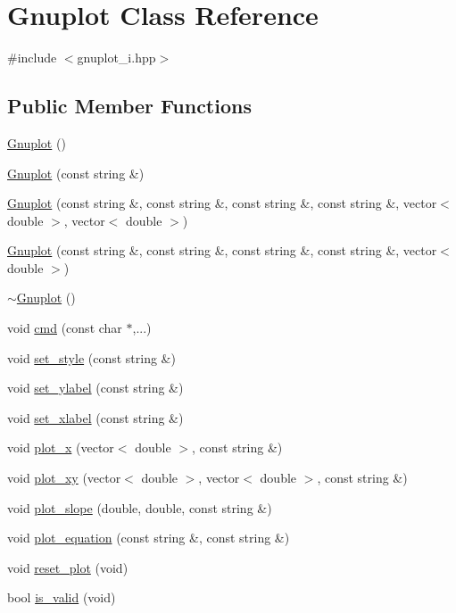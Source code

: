 \hypertarget{class_gnuplot}{}\section{Gnuplot Class Reference}
\label{class_gnuplot}


{\ttfamily \#include $<$gnuplot\+\_\+i.\+hpp$>$}

\subsection*{Public Member Functions}
\begin{DoxyCompactItemize}
\item 
\mbox{\hyperlink{class_gnuplot_a936d27de7b6f57d1f3d61491dc70f1ae}{Gnuplot}} ()
\item 
\mbox{\hyperlink{class_gnuplot_a4acdc327a6a9eb3c4ab3f37814dce26e}{Gnuplot}} (const string \&)
\item 
\mbox{\hyperlink{class_gnuplot_a93344aa5bd86c3ee4ab37aaa6bff92e0}{Gnuplot}} (const string \&, const string \&, const string \&, const string \&, vector$<$ double $>$, vector$<$ double $>$)
\item 
\mbox{\hyperlink{class_gnuplot_a22ec497060171153b0ce321763e9c7f9}{Gnuplot}} (const string \&, const string \&, const string \&, const string \&, vector$<$ double $>$)
\item 
\mbox{\hyperlink{class_gnuplot_a78a68f621caa87d1f34324fcd093c7bd}{$\sim$\+Gnuplot}} ()
\item 
void \mbox{\hyperlink{class_gnuplot_a6f299285af0a0ee2cf1722c469aa1a57}{cmd}} (const char $\ast$,...)
\item 
void \mbox{\hyperlink{class_gnuplot_accdd7b69237ead4109c74e1e440c185f}{set\+\_\+style}} (const string \&)
\item 
void \mbox{\hyperlink{class_gnuplot_af85dd1d368699914112460285ead0fde}{set\+\_\+ylabel}} (const string \&)
\item 
void \mbox{\hyperlink{class_gnuplot_ac9b0c04d47e375eb82f50437eda5e46e}{set\+\_\+xlabel}} (const string \&)
\item 
void \mbox{\hyperlink{class_gnuplot_ae3b7c28efb53f636431b9655085906be}{plot\+\_\+x}} (vector$<$ double $>$, const string \&)
\item 
void \mbox{\hyperlink{class_gnuplot_a1e817a58ef3e40ceaeb128c7e6437e8a}{plot\+\_\+xy}} (vector$<$ double $>$, vector$<$ double $>$, const string \&)
\item 
void \mbox{\hyperlink{class_gnuplot_a80c9d9e6bc3e64db073d9d39d6ec5d5f}{plot\+\_\+slope}} (double, double, const string \&)
\item 
void \mbox{\hyperlink{class_gnuplot_a55e6430f1329bf8a66f155dcacb9d112}{plot\+\_\+equation}} (const string \&, const string \&)
\item 
void \mbox{\hyperlink{class_gnuplot_ad54976652afe30231a850dd31e1ca70f}{reset\+\_\+plot}} (void)
\item 
bool \mbox{\hyperlink{class_gnuplot_a0daaf54cd8e41dbbd574722f3a831cfd}{is\+\_\+valid}} (void)
\end{DoxyCompactItemize}


